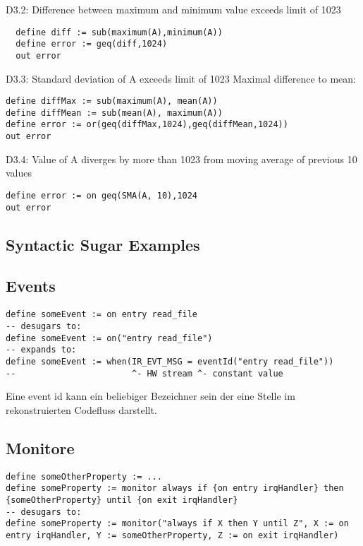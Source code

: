 D3.2: Difference between maximum and minimum value exceeds limit of 1023
\begin{lstlisting}
  define diff := sub(maximum(A),minimum(A))
  define error := geq(diff,1024)
  out error
\end{lstlisting}

D3.3: Standard deviation of A exceeds limit of 1023
Maximal difference to mean:
\begin{lstlisting}
define diffMax := sub(maximum(A), mean(A))
define diffMean := sub(mean(A), maximum(A))
define error := or(geq(diffMax,1024),geq(diffMean,1024))
out error
\end{lstlisting}

D3.4: Value of A diverges by more than 1023 from moving average of previous 10 values
\begin{lstlisting}
define error := on geq(SMA(A, 10),1024
out error
\end{lstlisting}

\subsection{Syntactic Sugar Examples}

\subsection{Events}

\begin{lstlisting}
define someEvent := on entry read_file
-- desugars to:
define someEvent := on("entry read_file")
-- expands to:
define someEvent := when(IR_EVT_MSG = eventId("entry read_file"))
--                       ^- HW stream ^- constant value
\end{lstlisting}

Eine event id kann ein beliebiger Bezeichner sein der eine Stelle im rekonstruierten Codefluss darstellt.

\subsection{Monitore}

\begin{lstlisting}
define someOtherProperty := ...
define someProperty := monitor always if {on entry irqHandler} then {someOtherProperty} until {on exit irqHandler}
-- desugars to:
define someProperty := monitor("always if X then Y until Z", X := on entry irqHandler, Y := someOtherProperty, Z := on exit irqHandler)
\end{lstlisting}

